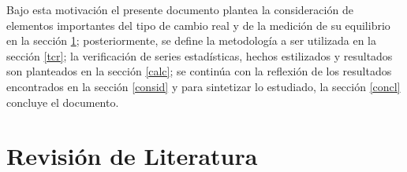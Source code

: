\documentclass[12pt,letterpaper]{article}
\begin{document}

Bajo esta motivación el presente documento plantea la consideración de elementos importantes del tipo de cambio real y de la medición de su equilibrio en la sección \ref{pre}; posteriormente, se define la metodología a ser utilizada en la sección \ref{tcr}; la verificación de series estadísticas, hechos estilizados y resultados son planteados en la sección \ref{calc}; se continúa con la reflexión de los resultados encontrados en la sección \ref{consid} y para sintetizar lo estudiado, la sección \ref{concl} concluye el documento.



\section{Revisión de Literatura}\label{pre}
\end{document}

